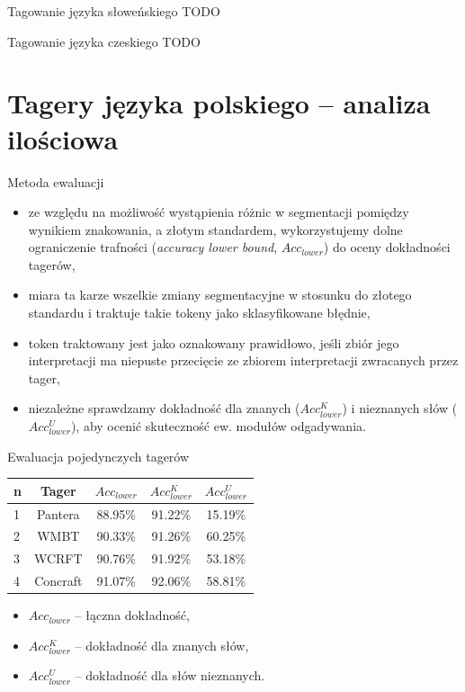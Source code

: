 \documentclass{beamer}
\begin{document}
\begin{frame}{Tagowanie języka słoweńskiego}
  TODO
\end{frame}

\begin{frame}{Tagowanie języka czeskiego}
  TODO
\end{frame}

\section{Tagery języka polskiego -- analiza ilościowa}
\frame{\sectionpage}

\begin{frame}{Metoda ewaluacji}
\begin{itemize}
\item ze względu na możliwość wystąpienia różnic w segmentacji pomiędzy wynikiem znakowania, a złotym standardem, wykorzystujemy dolne ograniczenie trafności (\emph{accuracy lower bound}, $Acc_{lower}$) do oceny dokładności tagerów,
\item miara ta karze wszelkie zmiany segmentacyjne w stosunku do złotego standardu i traktuje takie tokeny jako sklasyfikowane błędnie,
\item token traktowany jest jako oznakowany prawidłowo, jeśli zbiór jego interpretacji ma niepuste przecięcie ze zbiorem interpretacji zwracanych przez tager,
\item niezależne sprawdzamy dokładność dla znanych ($Acc^K_{lower}$) i nieznanych słów ($Acc^U_{lower}$), aby ocenić skuteczność ew. modułów odgadywania.
\end{itemize}
\end{frame}

\begin{frame}{Ewaluacja pojedynczych tagerów}
\begin{center}
\begin{tabular}{lcccc} \hline
n & Tager 		& $Acc_{lower}$	& $Acc^K_{lower}$	& $Acc^U_{lower}$	\\ \hline
1 & Pantera   & 88.95\%   & 91.22\% & 15.19\% \\
2 & WMBT	 	& 90.33\%		& 91.26\%	& 60.25\%	\\
3 & WCRFT	 	& 90.76\%		& 91.92\%	& 53.18\%	\\
4 & Concraft	& 91.07\%		& 92.06\%	& 58.81\%	\\
\end{tabular}
\end{center}
\begin{itemize}
\item $Acc_{lower}$ -- łączna dokładność,
\item $Acc^K_{lower}$ -- dokładność dla znanych słów,
\item $Acc^U_{lower}$ -- dokładność dla słów nieznanych.
\end{itemize}
\end{frame}
\end{document}

